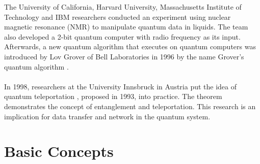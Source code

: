 \documentclass[12pt]{third-rep}
\begin{document}
The University of California, Harvard University, Massachusetts Institute of Technology and IBM researchers conducted an experiment using nuclear magnetic resonance (NMR) to manipulate quantum data in liquids. The team also developed a 2-bit quantum computer with radio frequency as its input. Afterwards, a new quantum algorithm that executes on quantum computers was introduced by Lov Grover of Bell Laboratories in 1996 by the name Grover's quantum algorithm \cite{intro-qc}. \\\\
In 1998, researchers at the University Innsbruck in Austria put the idea of quantum teleportation \cite{teleport}, proposed in 1993, into practice. The theorem demonstrates the concept of entanglement and teleportation. This research is an implication for data transfer and network in the quantum system.

\begingroup
\renewcommand{\cleardoublepage}{}
\renewcommand{\clearpage}{}
\chapter{Basic Concepts}
\endgroup
\end{document}

